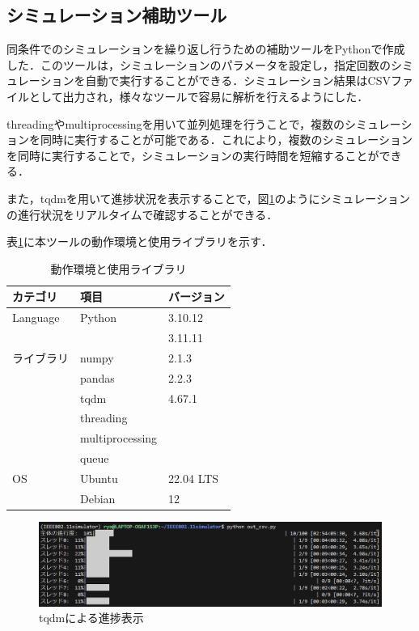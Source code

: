 \documentclass[a4paper,10pt]{ltjsarticle}
\begin{document}
\clearpage
\subsection{シミュレーション補助ツール}
同条件でのシミュレーションを繰り返し行うための補助ツールをPythonで作成した．このツールは，シミュレーションのパラメータを設定し，指定回数のシミュレーションを自動で実行することができる．シミュレーション結果はCSVファイルとして出力され，様々なツールで容易に解析を行えるようにした．

threadingやmultiprocessingを用いて並列処理を行うことで，複数のシミュレーションを同時に実行することが可能である．これにより，複数のシミュレーションを同時に実行することで，シミュレーションの実行時間を短縮することができる．

また，tqdmを用いて進捗状況を表示することで，図\ref{tqdm}のようにシミュレーションの進行状況をリアルタイムで確認することができる．

表\ref{tab:env_tool}に本ツールの動作環境と使用ライブラリを示す．

\begin{table}[H]
  \centering
  \caption{動作環境と使用ライブラリ}
  \label{tab:env_tool}
  \begin{tabular}{l|l|l}
      \hline
      カテゴリ & 項目 & バージョン \\ \hline
      Language           & Python        & 3.10.12 \\ 
      &               & 3.11.11 \\ \hline
      ライブラリ       & numpy         & 2.1.3\\ 
                      & pandas    & 2.2.3\\
                      & tqdm      & 4.67.1\\
                      & threading & \\
                      &multiprocessing & \\
                      & queue   & \\\hline
      OS               & Ubuntu        & 22.04 LTS \\ 
                       & Debian        & 12 \\ \hline
  \end{tabular}
\end{table}


\begin{figure}[H]
  \centering
  \includegraphics[width=\textwidth]{./assets/tqdm.png}
  \caption{tqdmによる進捗表示}
  \label{tqdm}
\end{figure}
\end{document}
